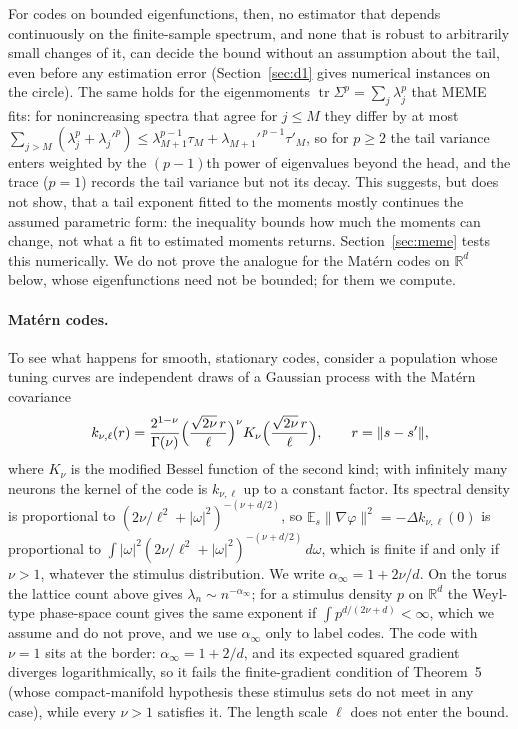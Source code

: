 \documentclass[11pt]{article}
\theoremstyle{definition}
\begin{document}
For codes on bounded eigenfunctions, then, no estimator that depends continuously on the finite-sample spectrum, and none that is robust to arbitrarily small changes of it, can decide the bound without an assumption about the tail, even before any estimation error (Section~\ref{sec:d1} gives numerical instances on the circle). The same holds for the eigenmoments $\operatorname{tr}\Sigma^p = \sum_j \lambda_j^p$ that MEME fits: for nonincreasing spectra that agree for $j \le M$ they differ by at most $\sum_{j > M} (\lambda_j^p + \lambda_j'^p) \le \lambda_{M+1}^{p-1} \tau_M + \lambda_{M+1}'^{\,p-1} \tau'_M$, so for $p \ge 2$ the tail variance enters weighted by the $(p-1)$th power of eigenvalues beyond the head, and the trace ($p = 1$) records the tail variance but not its decay. This suggests, but does not show, that a tail exponent fitted to the moments mostly continues the assumed parametric form: the inequality bounds how much the moments can change, not what a fit to estimated moments returns. Section~\ref{sec:meme} tests this numerically. We do not prove the analogue for the Mat\'ern codes on $\mathbb{R}^d$ below, whose eigenfunctions need not be bounded; for them we compute.

\paragraph{Mat\'ern codes.} To see what happens for smooth, stationary codes, consider a population whose tuning curves are independent draws of a Gaussian process with the Mat\'ern covariance
\begin{equation}\label{eq:matern}
  k_{\nu,\ell}(r) = \frac{2^{1-\nu}}{\Gamma(\nu)} \Bigl(\frac{\sqrt{2\nu}\, r}{\ell}\Bigr)^{\nu} K_\nu\Bigl(\frac{\sqrt{2\nu}\, r}{\ell}\Bigr), \qquad r = \|s - s'\|,
\end{equation}
where $K_\nu$ is the modified Bessel function of the second kind; with infinitely many neurons the kernel of the code is $k_{\nu,\ell}$ up to a constant factor. Its spectral density is proportional to $(2\nu/\ell^2 + |\omega|^2)^{-(\nu + d/2)}$, so $\mathbb{E}_s\|\nabla\varphi\|^2 = -\Delta k_{\nu,\ell}(0)$ is proportional to $\int |\omega|^2 (2\nu/\ell^2 + |\omega|^2)^{-(\nu + d/2)}\, d\omega$, which is finite if and only if $\nu > 1$, whatever the stimulus distribution. We write $\alpha_\infty = 1 + 2\nu/d$. On the torus the lattice count above gives $\lambda_n \sim n^{-\alpha_\infty}$; for a stimulus density $p$ on $\mathbb{R}^d$ the Weyl-type phase-space count gives the same exponent if $\int p^{d/(2\nu + d)} < \infty$, which we assume and do not prove, and we use $\alpha_\infty$ only to label codes. The code with $\nu = 1$ sits at the border: $\alpha_\infty = 1 + 2/d$, and its expected squared gradient diverges logarithmically, so it fails the finite-gradient condition of Theorem~5 (whose compact-manifold hypothesis these stimulus sets do not meet in any case), while every $\nu > 1$ satisfies it. The length scale $\ell$ does not enter the bound.
\end{document}
